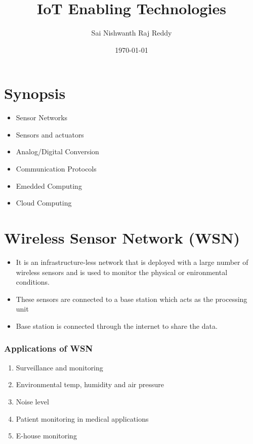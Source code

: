 \documentclass[11pt]{article}
\author{Sai Nishwanth Raj Reddy}
\date{\today}
\title{IoT Enabling Technologies}
\begin{document}
\maketitle
\tableofcontents


\section{Synopsis}
\label{sec:orgae6218e}
\begin{itemize}
\item Sensor Networks
\item Sensors and actuators
\item Analog/Digital Conversion
\item Communication Protocols
\item Emedded Computing
\item Cloud Computing
\end{itemize}

\section{Wireless Sensor Network (WSN)}
\label{sec:org9671b20}
\begin{itemize}
\item It is an infrastructure-less network that is deployed with a large number of wireless sensors
and is used to monitor the physical or enironmental conditions.
\item These sensors are connected to a base station which acts as the processing unit
\item Base station is connected through the internet to share the data.
\end{itemize}

\subsubsection{Applications of WSN}
\label{sec:org632b90d}
\begin{enumerate}
\item Surveillance and monitoring
\item Environmental temp, humidity and air pressure
\item Noise level
\item Patient monitoring in medical applications
\item E-house monitoring
\end{enumerate}
\end{document}
